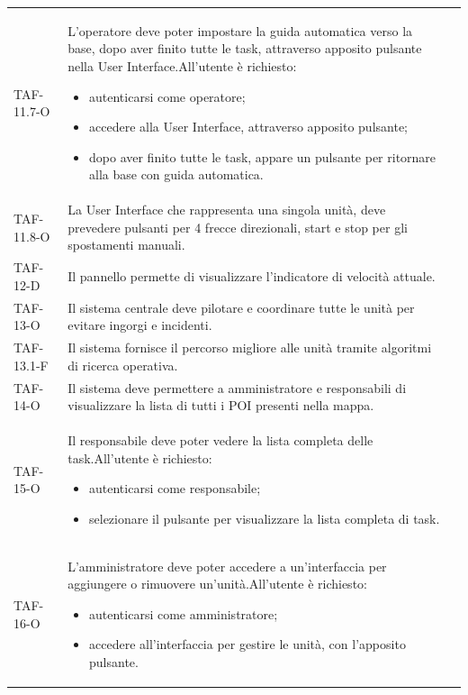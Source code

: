 \begin{longtable}{ >{\centering}p{} >{}p{}
		>{\centering}p{}}
	TAF-11.7-O & L'operatore deve poter impostare la guida automatica verso la base, dopo aver finito tutte le task, attraverso apposito pulsante nella User Interface.\newline All'utente è richiesto: \begin{itemize} \item autenticarsi come operatore; \item accedere alla User Interface, attraverso apposito pulsante; \item dopo aver finito tutte le task, appare un pulsante per ritornare alla base con guida automatica.\end{itemize} & 0\tabularnewline
	
	TAF-11.8-O & La User Interface che rappresenta una singola unità, deve prevedere pulsanti per 4 frecce direzionali, start e stop per gli spostamenti manuali. & 0\tabularnewline
	
	TAF-12-D & Il pannello permette di visualizzare l'indicatore di velocità attuale. & 0\tabularnewline
	
	TAF-13-O & Il sistema centrale deve pilotare e coordinare tutte le unità per evitare ingorgi e incidenti. & 0\tabularnewline
	
	TAF-13.1-F & Il sistema fornisce il percorso migliore alle unità tramite algoritmi di ricerca operativa. & 0\tabularnewline
	
	TAF-14-O & Il sistema deve permettere a amministratore e responsabili di visualizzare la lista di tutti i POI presenti nella mappa. & 0\tabularnewline
	
	TAF-15-O & Il responsabile deve poter vedere la lista completa delle task.\newline All'utente è richiesto:\begin{itemize} \item autenticarsi come responsabile; \item selezionare il pulsante per visualizzare la lista completa di task. \end{itemize} & 0\tabularnewline
	
	TAF-16-O & L'amministratore deve poter accedere a un'interfaccia per aggiungere o rimuovere un'unità.\newline All'utente è richiesto: \begin{itemize} \item autenticarsi come amministratore; \item accedere all'interfaccia per gestire le unità, con l'apposito pulsante.\end{itemize} & 0\tabularnewline
	

\end{longtable}
